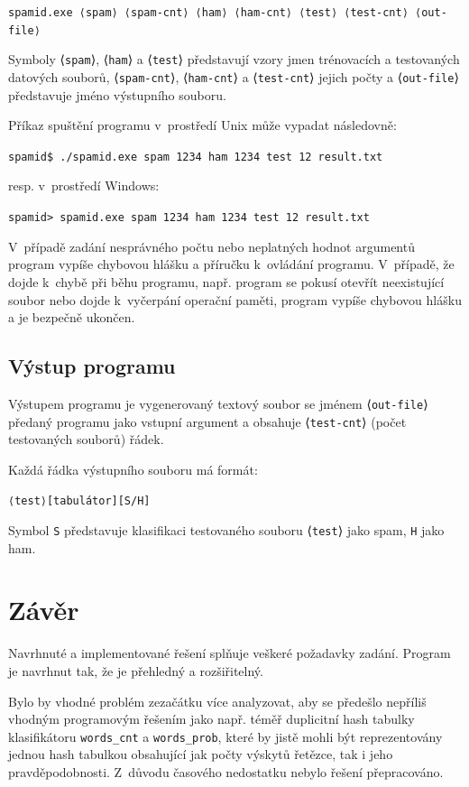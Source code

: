 \documentclass[a4paper, 12pt]{report}
\begin{document}
\texttt{spamid.exe ⟨spam⟩ ⟨spam-cnt⟩ ⟨ham⟩ ⟨ham-cnt⟩ ⟨test⟩ 
⟨test-\linebreak cnt⟩ ⟨out-file⟩}

Symboly ⟨\texttt{spam}⟩, ⟨\texttt{ham}⟩ a ⟨\texttt{test}⟩ představují 
vzory jmen trénovacích a testovaných datových souborů, 
⟨\texttt{spam-cnt}⟩, ⟨\texttt{ham-cnt}⟩ a ⟨\texttt{test-cnt}⟩ jejich počty 
a ⟨\texttt{out-file}⟩ představuje jméno výstupního souboru.

Příkaz spuštění programu v~prostředí Unix může vypadat následovně:

\texttt{spamid\$ ./spamid.exe spam 1234 ham 1234 test 12 result.txt}

resp. v~prostředí Windows:

\texttt{spamid> spamid.exe spam 1234 ham 1234 test 12 result.txt}

V~případě zadání nesprávného počtu nebo neplatných hodnot argumentů 
program vypíše chybovou hlášku a příručku k~ovládání programu. V~případě, 
že dojde k~chybě při běhu programu, např. program se pokusí otevřít 
neexistující soubor nebo dojde k~vyčerpání operační paměti, program vypíše 
chybovou hlášku a je bezpečně ukončen.

\section{Výstup programu}

Výstupem programu je vygenerovaný textový soubor se jménem 
⟨\texttt{out-file}⟩ předaný programu jako vstupní argument a obsahuje 
⟨\texttt{test-cnt}⟩ (počet testovaných souborů) řádek.

Každá řádka výstupního souboru má formát:

\texttt{⟨test⟩[tabulátor][S/H]}

Symbol \texttt{S} představuje klasifikaci testovaného souboru 
⟨\texttt{test}⟩ jako spam, \texttt{H} jako ham.

\chapter{Závěr}

Navrhnuté a implementované řešení splňuje veškeré požadavky zadání. 
Program je navrhnut tak, že je přehledný a rozšiřitelný.

Bylo by vhodné problém zezačátku více analyzovat, aby se předešlo nepříliš 
vhodným programovým řešením jako např. téměř duplicitní hash tabulky 
klasifikátoru \texttt{words\_cnt} a \texttt{words\_prob}, které by jistě 
mohli být reprezentovány jednou hash tabulkou obsahující jak počty výskytů 
řetězce, tak i jeho pravděpodobnosti. Z~důvodu časového nedostatku nebylo 
řešení přepracováno.
\end{document}
